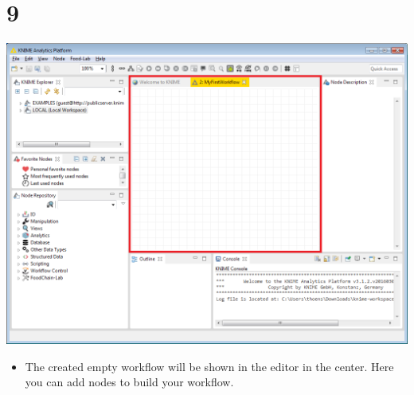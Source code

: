 \documentclass[10pt]{beamer}
\begin{document}
\section{9}
\begin{frame}
	\begin{center}
  		\includegraphics[height=0.6\textheight]{9.png}
	\end{center}
	\begin{itemize}
		\item The created empty workflow will be shown in the editor in the center. Here you can add nodes to build your workflow.
	\end{itemize}
\end{frame}
\end{document}
